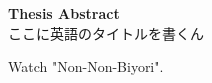 \documentclass[../main]{subfiles}
\begin{document}
\thispagestyle{empty}
\begin{center}
    {\Huge \textbf{Thesis Abstract}}\\
    {\Large ここに英語のタイトルを書くん}
\end{center}

Watch "Non-Non-Biyori".

\newpage
\end{document}
